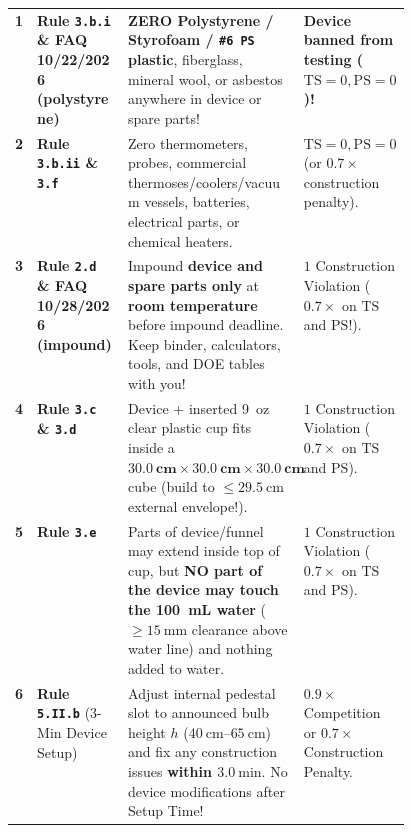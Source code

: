 \begin{rulebox}
\scriptsize
\par\smallskip\noindent
\begin{tabularx}{\linewidth}{@{}l L{0.23\linewidth} X L{0.23\linewidth}@{}}
\toprule
{} &  &  &  \\
\midrule
{} \textbf{1} & \textbf{Rule \texttt{3.b.i} \& FAQ 10/22/2026 (polystyrene)} & \textbf{ZERO Polystyrene / Styrofoam / \texttt{\#6 PS} plastic}, fiberglass, mineral wool, or asbestos anywhere in device or spare parts! & \textbf{Device banned from testing ($\mathrm{TS}=0, \mathrm{PS}=0$)!} \\
 \textbf{2} & \textbf{Rule \texttt{3.b.ii} \& \texttt{3.f}} & Zero thermometers, probes, commercial thermoses/coolers/vacuum vessels, batteries, electrical parts, or chemical heaters. & $\mathrm{TS}=0, \mathrm{PS}=0$ (or $0.7\times$ construction penalty). \\
 \textbf{3} & \textbf{Rule \texttt{2.d} \& FAQ 10/28/2026 (impound)} & Impound \textbf{device and spare parts only} at \textbf{room temperature} before impound deadline. Keep binder, calculators, tools, and  DOE tables with you! & $1$ Construction Violation ($\mathbf{0.7\times}$ on $\mathrm{TS}$ and $\mathrm{PS}$!). \\
 \textbf{4} & \textbf{Rule \texttt{3.c} \& \texttt{3.d}} & Device + inserted \SI{9}{oz} clear plastic cup fits inside a $\mathbf{\SI{30.0}{\centi\meter} \times \SI{30.0}{\centi\meter} \times \SI{30.0}{\centi\meter}}$ cube (build to $\le \SI{29.5}{\centi\meter}$ external envelope!). & $1$ Construction Violation ($\mathbf{0.7\times}$ on $\mathrm{TS}$ and $\mathrm{PS}$). \\
 \textbf{5} & \textbf{Rule \texttt{3.e}} & Parts of device/funnel may extend inside top of cup, but \textbf{NO part of the device may touch the \SI{100}{\milli\liter} water} ($\ge \SI{15}{\milli\meter}$ clearance above water line) and nothing added to water. & $1$ Construction Violation ($\mathbf{0.7\times}$ on $\mathrm{TS}$ and $\mathrm{PS}$). \\
 \textbf{6} & \textbf{Rule \texttt{5.II.b}} (3-Min Device Setup) & Adjust internal pedestal slot to announced bulb height $h$ ($\SIrange{40}{65}{\centi\meter}$) and fix any construction issues \textbf{within $\SI{3.0}{\minute}$}. No device modifications after Setup Time! & $0.9\times$ Competition or $0.7\times$ Construction Penalty. \\

\end{tabularx}
\end{rulebox}
